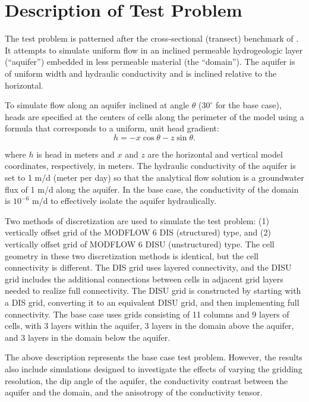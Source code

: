 \documentclass{article}
\begin{document}
\section{Description of Test Problem}

The test problem is patterned after the cross-sectional (transect) benchmark of \cite{bardot2022}. It attempts to simulate uniform flow in an inclined permeable hydrogeologic layer (``aquifer'') embedded in less permeable material (the ``domain''). The aquifer is of uniform width and hydraulic conductivity and is inclined relative to the horizontal.

To simulate flow along an aquifer inclined at angle $\theta$ ($30^{\circ}$ for the base case), heads are specified at the centers of cells along the perimeter of the model using a formula that corresponds to a uniform, unit head gradient:
\begin{equation}
\label{eqn:head_analyt_along}
h = - x \cos \theta - z \sin \theta.
\end{equation}

\noindent where $h$ is head in meters and $x$ and $z$ are the horizontal and vertical model coordinates, respectively, in meters. The hydraulic conductivity of the aquifer is set to 1 m/d (meter per day) so that the analytical flow solution is a groundwater flux of 1 m/d along the aquifer. In the base case, the conductivity of the domain is $10^{-6}$ m/d to effectively isolate the aquifer hydraulically.

Two methods of discretization are used to simulate the test problem: (1) vertically offset grid of the MODFLOW 6 DIS (structured) type, and (2) vertically offset grid of MODFLOW 6 DISU (unstructured) type. The cell geometry in these two discretization methods is identical, but the cell connectivity is different. The DIS grid uses layered connectivity, and the DISU grid includes the additional connections between cells in adjacent grid layers needed to realize full connectivity. The DISU grid is constructed by starting with a DIS grid, converting it to an equivalent DISU grid, and then implementing full connectivity. The base case uses grids consisting of 11 columns and 9 layers of cells, with 3 layers within the aquifer, 3 layers in the domain above the aquifer, and 3 layers in the domain below the aquifer. 

The above description represents the base case test problem. However, the results also include simulations designed to investigate the effects of varying the gridding resolution, the dip angle of the aquifer, the conductivity contrast between the aquifer and the domain, and the anisotropy of the conductivity tensor.
\end{document}
